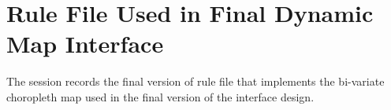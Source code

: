 \chapter{Rule File Used in Final Dynamic Map Interface} %

\label{AppendixD} %


The session records the final version of rule file that implements the
bi-variate choropleth map used in the final version of the interface
design.

\makeatletter
\def\verbatim@font{\linespread{1}\tiny\ttfamily}
\makeatother

